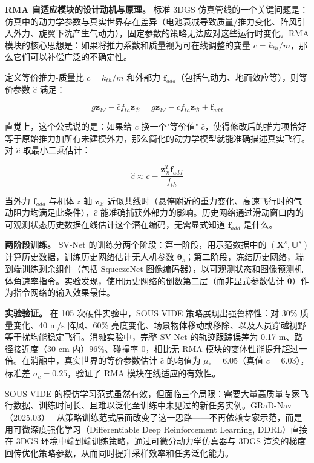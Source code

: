 \textbf{RMA 自适应模块的设计动机与原理。}
标准 3DGS 仿真管线的一个关键问题是：仿真中的动力学参数与真实世界存在差异（电池衰减导致质量/推力变化、阵风引入外力、旋翼下洗产生气动力），固定参数的策略无法应对这些运行时变化。RMA 模块的核心思想是：如果将推力系数和质量视为可在线调整的变量 $c = k_{th}/m$，那么它们可以补偿广泛的不确定性。

定义等价推力-质量比 $c = k_{th}/m$ 和外部力 $\bm{f}_{add}$（包括气动力、地面效应等），则等价参数 $\hat{c}$ 满足：

\begin{equation}
g\bm{z}_\mathcal{W} - \hat{c} f_{th} \bm{z}_\mathcal{B} = g\bm{z}_\mathcal{W} - c f_{th} \bm{z}_\mathcal{B} + \bm{f}_{add}
\end{equation}

直觉上，这个公式说的是：如果给 $c$ 换一个"等价值" $\hat{c}$，使得修改后的推力项恰好等于原始推力加所有未建模外力，那么简化的动力学模型就能准确描述真实飞行。对 $\hat{c}$ 取最小二乘估计：

\begin{equation}
\hat{c} \approx c - \frac{\bm{z}_\mathcal{B}^T \bm{f}_{add}}{f_{th}}
\end{equation}

当外力 $\bm{f}_{add}$ 与机体 $z$ 轴 $\bm{z}_\mathcal{B}$ 近似共线时（悬停附近的重力变化、高速飞行时的气动阻力均满足此条件），$\hat{c}$ 能准确捕获外部力的影响。历史网络通过滑动窗口内的可观测状态历史数据在线估计这个潜在编码，无需显式知道 $\bm{f}_{add}$ 是什么。

\textbf{两阶段训练。}
SV-Net 的训练分两个阶段：第一阶段，用示范数据中的 $(\bm{X}^s, \bm{U}^s)$ 计算历史数据，训练历史网络估计无人机参数 $\bm{\theta}_s$；第二阶段，冻结历史网络，端到端训练剩余组件（包括 SqueezeNet 图像编码器），以可观测状态和图像预测机体角速率指令。实验发现，使用历史网络的倒数第二层（而非显式参数估计 $\hat{\bm{\theta}}$）作为指令网络的输入效果最佳。

\textbf{实验验证。}
在 105 次硬件实验中，SOUS VIDE 策略展现出强鲁棒性：对 30\% 质量变化、40 m/s 阵风、60\% 亮度变化、场景物体移动或移除、以及人员穿越视野等干扰均能稳定飞行。消融实验中，完整 SV-Net 的轨迹跟踪误差为 0.17 m、路径接近度（30 cm 内）96\%、碰撞率 0，相比无 RMA 模块的变体性能提升超过一倍。在消融中，真实世界的等价参数估计 $\hat{c}$ 的均值为 $\mu_{\hat{c}}=6.05$（真值 $c=6.03$），标准差 $\sigma_{\hat{c}}=0.25$，验证了 RMA 模块在线适应的有效性。

SOUS VIDE 的模仿学习范式虽然有效，但面临三个局限：需要大量高质量专家飞行数据、训练时间长、且难以泛化至训练中未见过的新任务实例。GRaD-Nav（2025.03）~\cite{2503_03984} 从策略训练范式层面改变了这一思路——不再依赖专家示范，而是用可微深度强化学习（Differentiable Deep Reinforcement Learning, DDRL）直接在 3DGS 环境中端到端训练策略，通过可微分动力学仿真器与 3DGS 渲染的梯度回传优化策略参数，从而同时提升采样效率和任务泛化能力。

